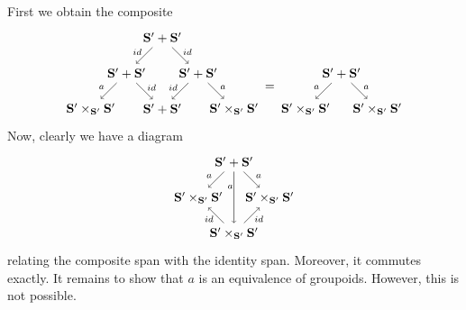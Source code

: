 \documentclass[11pt]{amsart}
\newcommand{\cat}[1]{\mathbf{#1}}
\theoremstyle{remark}
\theoremstyle{definition}
\begin{document}
First we obtain the composite 
\[
\begin{tikzpicture}
	\begin{scope}
	\node (v1) at (0,2) {$\cat{S}'+ \cat{S}'$};
	\node (v2) at (-1,1) {$\cat{S}' \times_{\cat{S}'} \cat{S}'$};
	\node (v3) at (1,1) {$\cat{S}'+ \cat{S}'$};
	\node (v4) at (2,2) {$\cat{S}'+ \cat{S}'$};
	\node (v5) at (3,1) {$\cat{S}' \times_{\cat{S}'} \cat{S}'$};
	\node (v6) at (1,3) {$\cat{S}'+ \cat{S}'$};
	\draw [->] (v1) to node[shift={(-0.2,0.1)}] {\scriptsize $a$} (v2);
	\draw [->] (v1) to node[shift={(0.2,0.1)}] {\scriptsize $id$} (v3);
	\draw [->]  (v4) edge node[shift={(-0.2,0.1)}] {\scriptsize $id$} (v3);
	\draw [->] (v4) edge node[shift={(0.2,0.1)}] {\scriptsize $a$} (v5);
	\draw [->]  (v6) edge node[shift={(-0.2,0.1)}] {\scriptsize $id$} (v1);
	\draw [->] (v6) edge node[shift={(0.2,0.1)}] {\scriptsize $id$} (v4);
	\end{scope}
	\begin{scope}[shift={(6,0)}]
	\node (v1) at (0,2) {$\cat{S}'+ \cat{S}'$};
	\node (v2) at (-1,1) {$\cat{S}' \times_{\cat{S}'} \cat{S}'$};
	\node (v3) at (1,1) {$\cat{S}' \times_{\cat{S}'} \cat{S}'$};
	\draw [->] (v1) to node [shift={(-0.2,0.1)}] {\scriptsize $a$} (v2);
	\draw [->] (v1) to node [shift={(0.2,0.1)}] {\scriptsize $a$} (v3);
	\end{scope}
	\node at (4,1.6) {$=$};
\end{tikzpicture}
\]
Now, clearly we have a diagram 
\[
\begin{tikzpicture}
	\node (v1) at (0,2) {$\cat{S}'+ \cat{S}'$};
	\node (v2) at (-1,1) {$\cat{S}' \times_{\cat{S}'} \cat{S}'$};
	\node (v3) at (1,1) {$\cat{S}' \times_{\cat{S}'} \cat{S}'$};
	\node (v4) at (0,0) {$\cat{S}' \times_{\cat{S}'} \cat{S}'$};
	\draw [->] (v1) to node [shift={(-0.2,0.1)}] {\scriptsize $a$} (v2);
	\draw [->] (v1) to node [shift={(0.2,0.1)}] {\scriptsize $a$} (v3);
	\draw [->]  (v4) edge node [shift={(-0.2,-0.1)}] {\scriptsize $id$} (v2);
	\draw [->]  (v4) edge node [shift={(0.2,-0.1)}] {\scriptsize $id$} (v3);
	\draw [->]  (v1) edge node [shift={(-0.1,0.3)}] {\scriptsize $a$} (v4);
\end{tikzpicture}
\]
relating the composite span with the identity span.  Moreover, it commutes exactly. It remains to show that $a$ is an equivalence of groupoids.  However, this is not possible.   

%
%
\end{document}
